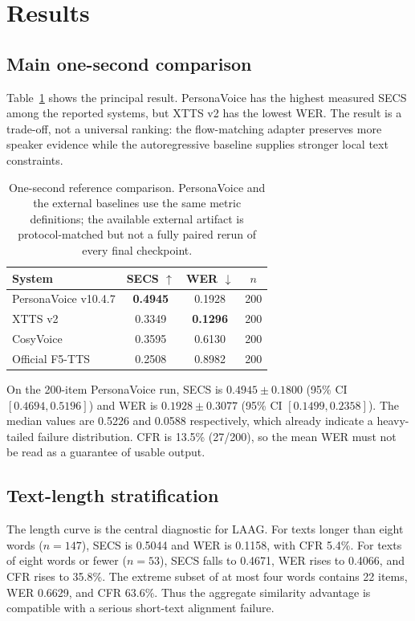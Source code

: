 \documentclass[10pt]{article}
\begin{document}
\section{Results}

\subsection{Main one-second comparison}

Table~\ref{tab:main} shows the principal result. PersonaVoice has the highest
measured SECS among the reported systems, but XTTS v2 has the lowest WER. The
result is a trade-off, not a universal ranking: the flow-matching adapter
preserves more speaker evidence while the autoregressive baseline supplies
stronger local text constraints.

\begin{table}[t]
\centering
\small
\begin{tabular}{lccc}
\toprule
System & SECS $\uparrow$ & WER $\downarrow$ & $n$ \\
\midrule
PersonaVoice v10.4.7 & \textbf{0.4945} & 0.1928 & 200 \\
XTTS v2 & 0.3349 & \textbf{0.1296} & 200 \\
CosyVoice & 0.3595 & 0.6130 & 200 \\
Official F5-TTS & 0.2508 & 0.8982 & 200 \\
\bottomrule
\end{tabular}
\caption{One-second reference comparison. PersonaVoice and the external
baselines use the same metric definitions; the available external artifact is
protocol-matched but not a fully paired rerun of every final checkpoint.}
\label{tab:main}
\end{table}

On the 200-item PersonaVoice run, SECS is $0.4945\pm0.1800$ (95\% CI
$[0.4694,0.5196]$) and WER is $0.1928\pm0.3077$ (95\% CI
$[0.1499,0.2358]$). The median values are 0.5226 and 0.0588 respectively,
which already indicate a heavy-tailed failure distribution. CFR is 13.5\%
(27/200), so the mean WER must not be read as a guarantee of usable output.

\subsection{Text-length stratification}

The length curve is the central diagnostic for LAAG. For texts longer than
eight words ($n=147$), SECS is 0.5044 and WER is 0.1158, with CFR 5.4\%. For
texts of eight words or fewer ($n=53$), SECS falls to 0.4671, WER rises to
0.4066, and CFR rises to 35.8\%. The extreme subset of at most four words
contains 22 items, WER 0.6629, and CFR 63.6\%. Thus the aggregate similarity
advantage is compatible with a serious short-text alignment failure.
\end{document}
